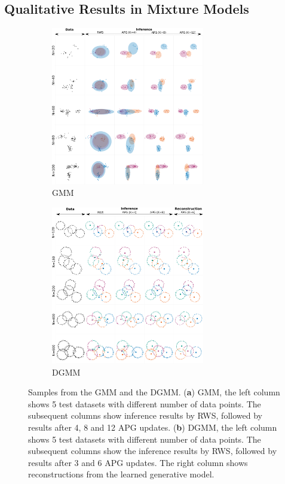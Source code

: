 \documentclass[anonymous=false, %
               format=acmsmall, %
               review=true, %
               screen=true, %
               nonacm=true]{acmart}
\theoremstyle{definition}
\begin{document}
\newpage
\subsection{Qualitative Results in Mixture Models}
\label{appendix:samples-mixture}
\begin{figure}[!h]
  \centering
  \begin{subfigure}[t]{0.5\textwidth}
  \includegraphics[width=67mm]{figures/gmm_samples.pdf}
  \vspace*{-1mm}
  \caption{GMM}
  \vspace{-1ex}
  \end{subfigure}%
  \begin{subfigure}[t]{0.5\textwidth}
  \includegraphics[width=67mm]{figures/dgmm_samples.pdf}
  \vspace*{-1mm}
  \caption{DGMM}
  \vspace{-1ex}
  \end{subfigure}
  \caption{Samples from the GMM and the DGMM. (\textbf{a}) GMM, the left column shows 5 test datasets with different number of data points. The subsequent columns show inference results by RWS, followed by results after 4, 8 and 12 APG updates. (\textbf{b}) DGMM, the left column shows 5 test datasets with different number of data points. The subsequent columns show the inference results by RWS, followed by results after 3 and 6 APG updates. The right column shows reconstructions from the learned generative model.}
  \label{samples-mixture}
\end{figure}
\newpage
\end{document}
